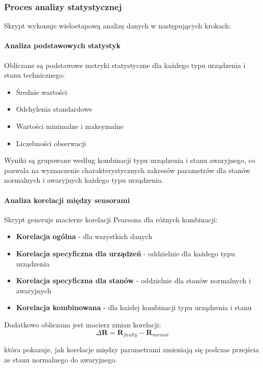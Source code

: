 \subsubsection{Proces analizy statystycznej}

Skrypt wykonuje wieloetapową analizę danych w następujących krokach:

\paragraph{Analiza podstawowych statystyk}
Obliczane są podstawowe metryki statystyczne dla każdego typu urządzenia i stanu technicznego:
\begin{itemize}
    \item Średnie wartości
    \item Odchylenia standardowe
    \item Wartości minimalne i maksymalne
    \item Liczebności obserwacji
\end{itemize}

Wyniki są grupowane według kombinacji typu urządzenia i stanu awaryjnego, co pozwala na wyznaczenie charakterystycznych zakresów parametrów dla stanów normalnych i awaryjnych każdego typu urządzenia.

\paragraph{Analiza korelacji między sensorami}
Skrypt generuje macierze korelacji Pearsona dla różnych kombinacji:
\begin{itemize}
    \item \textbf{Korelacja ogólna} - dla wszystkich danych
    \item \textbf{Korelacja specyficzna dla urządzeń} - oddzielnie dla każdego typu urządzenia
    \item \textbf{Korelacja specyficzna dla stanów} - oddzielnie dla stanów normalnych i awaryjnych
    \item \textbf{Korelacja kombinowana} - dla każdej kombinacji typu urządzenia i stanu
\end{itemize}

Dodatkowo obliczana jest macierz zmian korelacji:
$$\Delta\mathbf{R} = \mathbf{R}_{faulty} - \mathbf{R}_{normal}$$

która pokazuje, jak korelacje między parametrami zmieniają się podczas przejścia ze stanu normalnego do awaryjnego.

